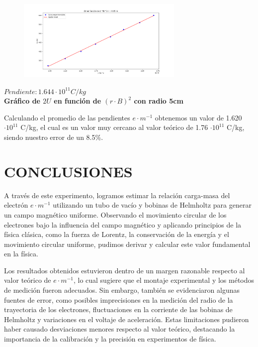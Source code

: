 \documentclass[a4paper]{article}
\begin{document}
    \begin{figure}[h!]
        \vspace{-2mm}
        \centering
        \includegraphics[width = 8cm] {../imagenes/radio5.png}
        \vspace{-5mm}
    \end{figure}

    \begin{center}
        \textbf{$Pendiente: 1.644 \cdot 10^{11} C/kg$} \\
        \textbf{Gráfico de $2U$ en función de $(r \cdot B)^2$ con radio 5cm} \\
    \end{center}

    \newpage
    \noindent
    \thispagestyle{fancy}

    \indent Calculando el promedio de las pendientes $e \cdot m^{-1}$ obtenemos un valor de 1.620 $\cdot 10^{11}$ C/kg, el cual es un valor muy cercano al valor teórico de 1.76 $\cdot 10^{11}$ C/kg, siendo nuestro error de un 8.5\%.


\section{CONCLUSIONES}

    \indent A través de este experimento, logramos estimar la relación carga-masa del electrón $e \cdot m^{-1}$ utilizando un tubo de vacío y bobinas de Helmholtz para generar un campo magnético uniforme. Observando el movimiento circular de los electrones bajo la influencia del campo magnético y aplicando principios de la física clásica, como la fuerza de Lorentz, la conservación de la energía y el movimiento circular uniforme, pudimos derivar y calcular este valor fundamental en la física.

    Los resultados obtenidos estuvieron dentro de un margen razonable respecto al valor teórico de $e \cdot m^{-1}$, lo cual sugiere que el montaje experimental y los métodos de medición fueron adecuados. Sin embargo, también se evidenciaron algunas fuentes de error, como posibles imprecisiones en la medición del radio de la trayectoria de los electrones, fluctuaciones en la corriente de las bobinas de Helmholtz y variaciones en el voltaje de aceleración. Estas limitaciones pudieron haber causado desviaciones menores respecto al valor teórico, destacando la importancia de la calibración y la precisión en experimentos de física.
\end{document}

